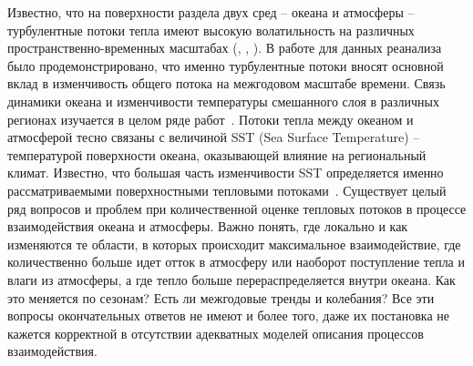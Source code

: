 Известно, что на поверхности раздела двух сред -- океана и атмосферы -- турбулентные потоки тепла имеют высокую волатильность на различных пространственно-временных масштабах (\cite{small2019air}, \cite{tilinina2018association}, \cite{tian2017air}). В работе \cite{bentamy2017review} для данных реанализа было продемонстрировано, что именно турбулентные потоки вносят основной вклад в изменчивость общего потока на межгодовом масштабе времени. Связь динамики океана и изменчивости температуры смешанного слоя в различных регионах изучается в целом ряде работ~\cite{ashin2019observed,schmeisser2019role,patrizio2021quantifying}.
Потоки тепла между океаном и атмосферой тесно связаны с величиной SST (Sea Surface Temperature) -- температурой поверхности океана, оказывающей влияние на региональный климат. Известно, что большая часть изменчивости SST определяется именно рассматриваемыми поверхностными тепловыми потоками~\cite{schneider2015atmospheric,hausmann2017mechanisms,li2019decadal,blein2022parametrizing}. Существует целый ряд вопросов и проблем при количественной оценке тепловых потоков в процессе взаимодействия океана и атмосферы. Важно понять, где локально и как изменяются те области, в которых происходит максимальное взаимодействие, где количественно больше идет отток в атмосферу или наоборот поступление тепла и влаги из атмосферы, а где тепло больше перераспределяется внутри океана. Как это меняется по сезонам? Есть ли межгодовые тренды и колебания? Все эти вопросы окончательных ответов не имеют и более того, даже их постановка не кажется корректной в отсутствии адекватных моделей описания процессов взаимодействия.
